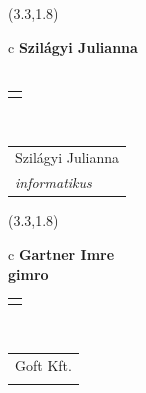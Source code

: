 \documentclass[11pt]{article}
\begin{document}
\makebox(3.3,1.8){
  \renewcommand\arraystretch{1.3}
  \begin{tabular}[c]{c}
    \hspace{8.5mm}
    \LARGE\bf{ Szilágyi Julianna }\\
    \hspace{8.5mm}
    \Large{  }\\
    \renewcommand\arraystretch{3}
    \begin{tabular}[c]{c}
      \centering
      \fontfamily{phv}\selectfont{
        \textbf{
          \textsc{
            \scriptsize{
            \color{Dark}{ Ismerkedő }\color{Bright}{ Webmester }\color{Bright}{ Sminkmester }\color{Dark}{ Programozó }
            }
          }
        }
      }
    \end{tabular}
    \\
    \renewcommand\arraystretch{1}
    \begin{tabular}{p{3.3in}}
      \hspace{.7cm}Szilágyi Julianna\\
      \hspace{.7cm}\emph{ informatikus }\\
    \end{tabular}
  \end{tabular}
}

\makebox(3.3,1.8){
  \renewcommand\arraystretch{1.3}
  \begin{tabular}[c]{c}
    \hspace{8.5mm}
    \LARGE\bf{ Gartner Imre }\\
    \hspace{8.5mm}
    \Large{ gimro }\\
    \renewcommand\arraystretch{3}
    \begin{tabular}[c]{c}
      \centering
      \fontfamily{phv}\selectfont{
        \textbf{
          \textsc{
            \scriptsize{
            \color{Dark}{ Ismerkedő }\color{Bright}{ Webmester }\color{Bright}{ Sminkmester }\color{Dark}{ Programozó }
            }
          }
        }
      }
    \end{tabular}
    \\
    \renewcommand\arraystretch{1}
    \begin{tabular}{p{3.3in}}
      \hspace{.7cm}Goft Kft.\\
      \hspace{.7cm}\emph{  }\\
    \end{tabular}
  \end{tabular}
}
\end{document}
